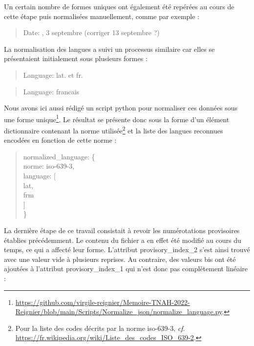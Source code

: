 \documentclass[a4paper,12pt,twoside]{book}
\begin{document}
	\noindent Un certain nombre de formes uniques ont également été repérées au cours de cette étape puis normalisées manuellement, comme par exemple :
	
	\begin{quotation}
		\textquotesingle Date\textquotesingle : , 3 septembre (corriger 13 septembre ?)\textquotesingle
	\end{quotation}

	\noindent La normalisation des langues a suivi un processus similaire car elles se présentaient initialement sous plusieurs formes :
	
	\begin{quotation}
		\textquotesingle Language\textquotesingle : \textquotesingle lat. et fr.\textquotesingle
	\end{quotation}

	\begin{quotation}
		\textquotesingle Language\textquotesingle : \textquotesingle francais\textquotesingle
	\end{quotation}
	
	\pagebreak
	
	\noindent Nous avons ici aussi rédigé un script python pour normaliser ces données sous une forme unique\footnote{\url{https://github.com/virgile-reignier/Memoire-TNAH-2022-Reignier/blob/main/Scripts/Normalize_json/normalize_language.py}.}. Le résultat se présente donc sous la forme d'un élément dictionnaire contenant la norme utilisée\footnote{Pour la liste des codes décrits par la norme iso-639-3, \textit{cf}. \url{https://fr.wikipedia.org/wiki/Liste_des_codes_ISO_639-2}.} et la liste des langues reconnues encodées en fonction de cette norme :
	
	\begin{quotation}
				\textquotesingle normalized\_language\textquotesingle : \{\\
			\indent\indent \textquotesingle norme\textquotesingle : \textquotesingle iso-639-3\textquotesingle ,\\
			\indent\indent \textquotesingle language\textquotesingle : [\\
			\indent\indent\indent \textquotesingle lat\textquotesingle ,\\
			\indent\indent\indent \textquotesingle frm\textquotesingle \\
			\indent\indent]\\
			\indent\}
	\end{quotation}
	
	\noindent La dernière étape de ce travail consistait à revoir les numérotations provisoires établies précédemment. Le contenu du fichier a en effet été modifié au cours du temps, ce qui a affecté leur forme. L'attribut \og provisory\_index\_2\fg{} s'est ainsi trouvé avec une valeur vide à plusieurs reprises. Au contraire, des valeurs \og bis\fg{} ont été ajoutées à l'attribut \og provisory\_index\_1\fg{} qui n'est donc pas complètement linéaire :
	
\end{document}
